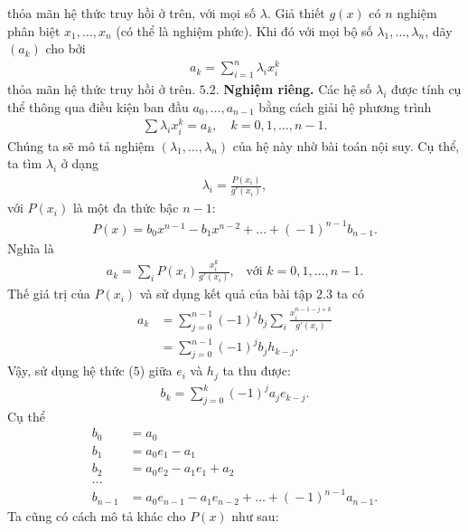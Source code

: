 \begin{multicols}{2}
	thỏa mãn hệ thức truy hồi  ở trên, với mọi số $\lambda$.
	\vskip 0.1cm	
	Giả thiết $g(x)$ có $n$ { nghiệm phân biệt} $x_1,\ldots,x_n$ (có thể là nghiệm phức). Khi đó với mọi bộ số $\lambda_1,\ldots, \lambda_n$, dãy $(a_k)$ cho bởi
	\begin{align*}
		a_k=\sum_{i=1}^n \lambda_i x_i^k
	\end{align*}
	thỏa mãn hệ thức truy hồi ở trên.
	\vskip 0.1cm	
	$\pmb{5.2.}$ \textbf{\color{hoccungpi}Nghiệm riêng.}
	Các hệ số $\lambda_i$ được tính cụ thể thông qua điều kiện ban đầu $a_0,\ldots,a_{n-1}$ bằng cách giải hệ phương trình
	\begin{align*}
		\label{ini-cond}\sum \lambda_i x_i^k=a_k,\quad k=0,1,\ldots,n-1. \tag{$10$}
	\end{align*}
	Chúng ta sẽ mô tả nghiệm $(\lambda_1,\ldots,\lambda_n)$ của hệ này nhờ bài toán nội suy. 
	Cụ thể, ta tìm $\lambda_i$ ở dạng
	\begin{align*}
		\lambda_i=\frac{P(x_i)}{g'(x_i)},
	\end{align*}
	với $P(x_i)$ là một đa thức bậc $n-1$:
	\begin{align*}
		P(x)\!=\!b_0x^{n\!-\!1}\!-\!b_1x^{n\!-\!2}\!+\!\ldots\!+\!(\!-\!1)^{n\!-\!1}b_{n\!-\!1}.
	\end{align*}
	Nghĩa là
	\begin{align*}
		a_k\!=\!\sum_iP(x_i)\frac{x_i^k}{g'(x_i)},\,\,\, \text{ với } k=0,1,\ldots,n\!-\!1.
	\end{align*}
	Thế giá trị của $P(x_i)$ và sử dụng kết quả của bài tập $2.3$ ta có
	\begin{align*}
		a_k&=\sum_{j=0}^{n-1}(-1)^jb_j
		{\sum_i
			\frac{x_i^{n-1-j+k}}{g'(x_i)}}\\
		&=\sum_{j=0}^{n-1}(-1)^jb_j{ h_{k-j}}.
	\end{align*}
	Vậy, sử dụng hệ thức ($5$) giữa $e_i$ và $h_j$ ta thu được: 
	\begin{align*}
		b_k=\sum_{j=0}^k(-1)^ja_je_{k-j}. \tag{$11$}
	\end{align*}
	Cụ thể
	\begin{align*}
		b_0&=a_0\\
		b_1&=a_0e_1-a_1\\
		b_2&=a_0e_2-a_1e_1+a_2\\
		\dots&\\
		b_{n\!-\!1}&=a_0e_{n\!-\!1}\!-\!a_1e_{n\!-\!2}\!+\!\ldots\!+\!(\!-\!1)^{n\!-\!1}a_{n\!-\!1}.
	\end{align*}
	Ta cũng có cách mô tả khác cho $P(x)$ như sau:
	\begin{align*}

\end{align*}
\end{multicols}
